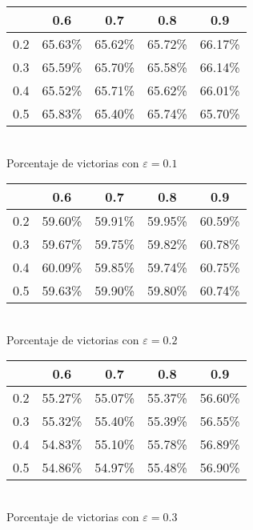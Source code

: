 \begin{center}
\begin{tabular}{|c||c|c|c|c|}
	\hline
	\backslashbox{$\alpha$}{$\gamma$} & 0.6 & 0.7 & 0.8 & 0.9\\
	\hline
	\hline
	0.2 & 65.63\% & 65.62\% & 65.72\% & \cellcolor{intvier}66.17\% \\
	\hline
	0.3 & 65.59\% & 65.70\% & 65.58\% & 66.14\% \\
	\hline
	0.4 & 65.52\% & 65.71\% & 65.62\% & 66.01\% \\
	\hline
	0.5 & 65.83\% & 65.40\% & 65.74\% & 65.70\% \\
	\hline
\end{tabular}\\
Porcentaje de victorias con $\varepsilon=0.1$
\end{center}
\begin{center}
\begin{tabular}{|c||c|c|c|c|}
	\hline
	\backslashbox{$\alpha$}{$\gamma$} & 0.6 & 0.7 & 0.8 & 0.9\\
	\hline
	\hline
	0.2 & 59.60\% & 59.91\% & 59.95\% & 60.59\% \\
	\hline
	0.3 & 59.67\% & 59.75\% & 59.82\% & \cellcolor{intvier}60.78\% \\
	\hline
	0.4 & 60.09\% & 59.85\% & 59.74\% & 60.75\% \\
	\hline
	0.5 & 59.63\% & 59.90\% & 59.80\% & 60.74\% \\
	\hline
\end{tabular}\\
Porcentaje de victorias con $\varepsilon=0.2$
\end{center}
\begin{center}
\begin{tabular}{|c||c|c|c|c|}
	\hline
	\backslashbox{$\alpha$}{$\gamma$} & 0.6 & 0.7 & 0.8 & 0.9\\
	\hline
	\hline
	0.2 & 55.27\% & 55.07\% & 55.37\% & 56.60\% \\
	\hline
	0.3 & 55.32\% & 55.40\% & 55.39\% & 56.55\% \\
	\hline
	0.4 & 54.83\% & 55.10\% & 55.78\% & 56.89\% \\
	\hline
	0.5 & 54.86\% & 54.97\% & 55.48\% & \cellcolor{intvier}56.90\% \\
	\hline
\end{tabular}\\
Porcentaje de victorias con $\varepsilon=0.3$
\end{center}
